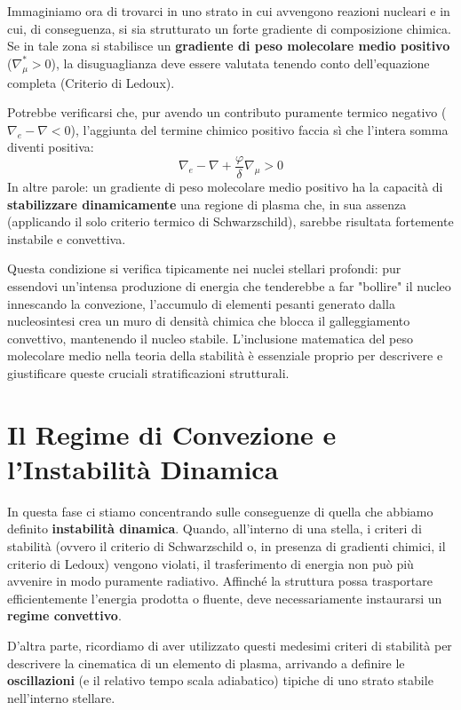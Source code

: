Immaginiamo ora di trovarci in uno strato in cui avvengono reazioni nucleari e in cui, di conseguenza, si sia strutturato un forte gradiente di composizione chimica. Se in tale zona si stabilisce un \textbf{gradiente di peso molecolare medio positivo} ($\nabla_\mu^* > 0$), la disuguaglianza deve essere valutata tenendo conto dell'equazione completa (Criterio di Ledoux).

Potrebbe verificarsi che, pur avendo un contributo puramente termico negativo ($\nabla_e - \nabla < 0$), l'aggiunta del termine chimico positivo faccia sì che l'intera somma diventi positiva:
\begin{equation}
\nabla_e - \nabla + \frac{\varphi}{\delta} \nabla_\mu > 0
\end{equation}
In altre parole: un gradiente di peso molecolare medio positivo ha la capacità di \textbf{stabilizzare dinamicamente} una regione di plasma che, in sua assenza (applicando il solo criterio termico di Schwarzschild), sarebbe risultata fortemente instabile e convettiva.

Questa condizione si verifica tipicamente nei nuclei stellari profondi: pur essendovi un'intensa produzione di energia che tenderebbe a far "bollire" il nucleo innescando la convezione, l'accumulo di elementi pesanti generato dalla nucleosintesi crea un muro di densità chimica che blocca il galleggiamento convettivo, mantenendo il nucleo stabile. L'inclusione matematica del peso molecolare medio nella teoria della stabilità è essenziale proprio per descrivere e giustificare queste cruciali stratificazioni strutturali.

\section{Il Regime di Convezione e l'Instabilità Dinamica}

In questa fase ci stiamo concentrando sulle conseguenze di quella che abbiamo definito \textbf{instabilità dinamica}. Quando, all'interno di una stella, i criteri di stabilità (ovvero il criterio di Schwarzschild o, in presenza di gradienti chimici, il criterio di Ledoux) vengono violati, il trasferimento di energia non può più avvenire in modo puramente radiativo. Affinché la struttura possa trasportare efficientemente l'energia prodotta o fluente, deve necessariamente instaurarsi un \textbf{regime convettivo}.

D'altra parte, ricordiamo di aver utilizzato questi medesimi criteri di stabilità per descrivere la cinematica di un elemento di plasma, arrivando a definire le \textbf{oscillazioni} (e il relativo tempo scala adiabatico) tipiche di uno strato stabile nell'interno stellare.

